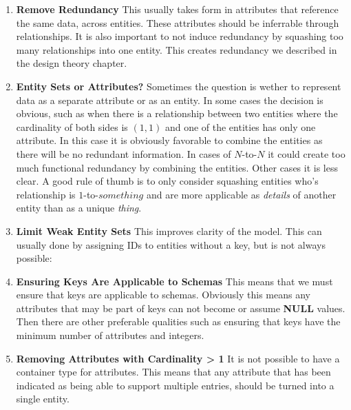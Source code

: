 \documentclass{report}
\begin{document}
\begin{enumerate}
    \item \textbf{Remove Redundancy} This usually takes form in attributes that reference the same data, across entities. These attributes should be inferrable through relationships. It is also important to not induce redundancy by squashing too many relationships into one entity. This creates redundancy we described in the design theory chapter.
    \item \textbf{Entity Sets or Attributes?} Sometimes the question is wether to represent data as a separate attribute or as an entity. In some cases the decision is obvious, such as when there is a relationship between two entities where the cardinality of both sides is $(1,1)$ and one of the entities has only one attribute. In this case it is obviously favorable to combine the entities as there will be no redundant information. In cases of $N$-to-$N$ it could create too much functional redundancy by combining the entities. Other cases it is less clear. A good rule of thumb is to only consider squashing entities who's relationship is $1$-to-$something$ and  are more applicable as \textit{details} of another entity than as a unique \textit{thing}. 
    \item \textbf{Limit Weak Entity Sets} This improves clarity of the model. This can usually done by assigning IDs to entities without a key, but is not always possible:
    \item \textbf{Ensuring Keys Are Applicable to Schemas} This means that we must ensure that keys are applicable to schemas. Obviously this means any attributes that may be part of keys can not become or assume \textbf{NULL} values. Then there are other preferable qualities such as ensuring that keys have the minimum number of attributes and integers.
    \item \textbf{Removing Attributes with Cardinality > 1} It is not possible to have a container type for attributes. This means that any attribute that has been indicated as being able to support multiple entries, should be turned into a single entity.
\end{enumerate}
\end{document}
